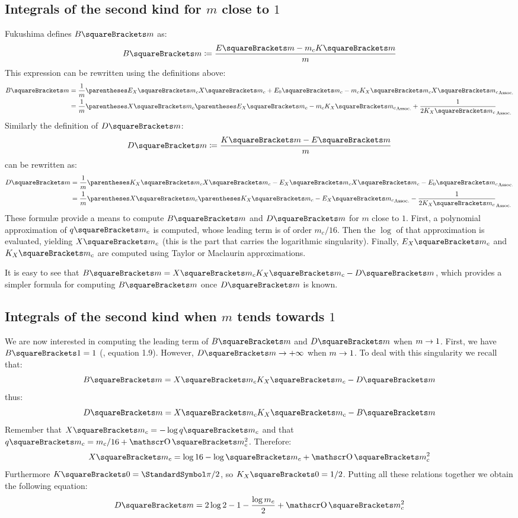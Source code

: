 \documentclass[10pt, a4paper, twoside]{basestyle}
\begin{document}
\subsection*{Integrals of the second kind for $m$ close to $1$}
Fukushima defines $B\of{m}$ as:
\[
B\of{m} \DefineAs \frac{E\of{m} - m_c K\of{m}}{m}
\]
This expression can be rewritten using the definitions above:
\begin{align*}
B\of{m} &= \frac{1}{m}\pa{E_X\of{m_c} X\of{m_c} + E_0\of{m_c} - m_c K_X\of{m_c} X\of{m_c}}\\
&= \frac{1}{m}\pa{X\of{m_c}\pa{E_X\of{m_c} - m_c K_X\of{m_c}} + \frac{1}{2 K_X\of{m_c}}}
\end{align*}
Similarly the definition of $D\of{m}$:
\[
D\of{m} \DefineAs \frac{K\of{m} - E\of{m}}{m}
\]
can be rewritten as:
\begin{align*}
D\of{m} &= \frac{1}{m}\pa{K_X\of{m_c} X\of{m_c} - E_X\of{m_c} X\of{m_c} - E_0\of{m_c}}\\
&= \frac{1}{m}\pa{X\of{m_c}\pa{K_X\of{m_c} - E_X\of{m_c}} - \frac{1}{2 K_X\of{m_c}}}
\end{align*}
These formulæ provide a means to compute $B\of{m}$ and $D\of{m}$ for $m$ close to $1$.  First, a polynomial approximation of $q\of{m_c}$
is computed, whose leading term is of order $m_c / 16$.  Then the $\log$ of that approximation is evaluated, yielding $X\of{m_c}$ (this
is the part that carries the logarithmic singularity).  Finally, $E_X\of{m_c}$ and $K_X\of{m_c}$ are computed using
Taylor or Maclaurin approximations.

It is easy to see that $B\of{m} = X\of{m_c} K_X\of{m_c} - D\of{m}$, which provides a simpler formula for computing $B\of{m}$ once 
$D\of{m}$ is known.

\subsection*{Integrals of the second kind when $m$ tends towards $1$}
We are now interested in computing the leading term of $B\of{m}$ and $D\of{m}$ when $\conv m 1$.  First, we have $B\of{1} = 1$ 
(\cite{Fukushima2011a}, equation 1.9).  However, $\conv {D\of{m}} +\infty$ when $\conv m 1$.  To deal with this singularity we recall that:
\[
B\of{m} = X\of{m_c} K_X\of{m_c} - D\of{m}
\]
thus:
\[
D\of{m} = X\of{m_c} K_X\of{m_c} - B\of{m}
\]
Remember that $X\of{m_c} = -\log q\of{m_c}$ and that $q\of{m_c} = m_c / 16 + \BigO\of{m_c^2}$.  Therefore:
\[
X\of{m_c} = \log 16 - \log\of{m_c} + \BigO\of{m_c^2}
\]
Furthermore $K\of{0} = \Pi / 2$, so $K_X\of{0} = 1/2$.  Putting all these relations together we obtain the following equation:
\[
D\of{m} = 2 \log 2 - 1 - \frac{\log m_c}{2} + \BigO\of{m_c^2}
\]
\end{document}
